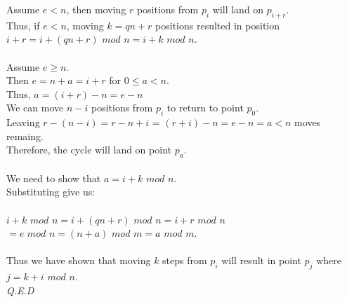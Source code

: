 \documentclass[a4paper,12pt]{article}
\begin{document}
Assume $e < n$, then moving $r$ positions from $p_i$ will land on $p_{i + r}$.\\
Thus, if $e < n$, moving $k = qn + r$ positions resulted in position $i + r = i + (qn + r)$ $mod$ $n = i + k$ $mod$ $n$.\\
\\
Assume $e \geq n$.\\
Then $e = n + a = i + r$ for $0 \leq a < n$.\\
Thus, $a = (i + r) - n = e - n$
\\
We can move $n - i$ positions from $p_i$ to return to point $p_0$.\\
Leaving $r - (n - i) = r - n + i$ = $(r + i) - n = e - n = a < n$ moves remaing.\\
Therefore, the cycle will land on point $p_a$.\\
\\
We need to show that $a = i + k$ $mod$ $n$.\\
Substituting give us:\\
\\
$i + k$ $mod$ $n = i + (qn + r)$ $mod$ $n = i + r$ $mod$ $n$\\ 
$= e$ $mod$ $n = (n + a)$ $mod$ $m = a$ $mod$ $m$.\\ 
\\
Thus we have shown that moving $k$ steps from $p_i$ will result in point $p_j$ where $j = k + i$ $mod$ $n$.\\
\textit{Q.E.D}
\end{document}
